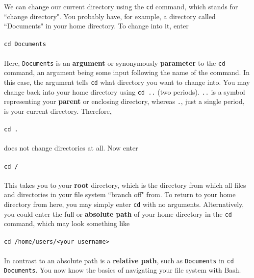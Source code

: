 \documentclass{article}
\begin{document}
We can change our current directory using the \verb|cd| command, which stands for ``change directory". 
You probably have, for example, a directory called ``Documents" in your home directory. To change into it, enter \\ \\
\verb|cd Documents| \\ \\
Here, \verb|Documents| is an \textbf{argument} or synonymously \textbf{parameter} to the 
\verb|cd| command, an argument being some input following the name of the command. In this case, the argument tells \verb|cd|
what directory you want to change into. You may change back into your home directory using \verb|cd ..| (two periods). 
\verb|..| is a
symbol representing your \textbf{parent} or enclosing directory, whereas \verb|.|, just a single period, is your current
directory. Therefore, \\ \\
\verb|cd .| \\ \\ 
does not change directories at all. Now enter \\ \\ 
\verb|cd /| 
\\ \\ 
This takes you to your 
\textbf{root} directory, which is the directory from which all files and directories in your file system ``branch off"
from. To return to your home directory from here, you may simply enter \verb|cd| with no arguments. Alternatively, you
could enter the full or \textbf{absolute path} of your home directory in the \verb|cd| command, which may look something 
like \\ \\ 
\verb|cd /home/users/<your username>| \\ \\
In contrast to an absolute path is a \textbf{relative path}, such as 
\verb|Documents| in \verb|cd Documents|. You now know the basics of navigating your file system with Bash.
\end{document}
